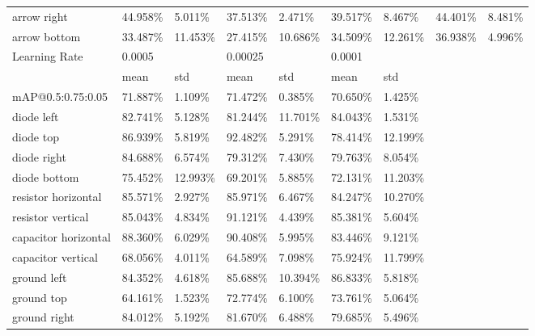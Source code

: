 \begin{table}[H]
\begin{center}
\begin{tabular}{|l|l|l|l|l|l|l|l|l|}
arrow right                     & 44.958\% & 5.011\%  & 37.513\% & 2.471\%  & 39.517\% & 8.467\%  & 44.401\% & 8.481\%   \\
\rowcolor{lightgray!50}
arrow bottom                    & 33.487\% & 11.453\% & 27.415\% & 10.686\% & 34.509\% & 12.261\% & 36.938\% & 4.996\%   \\
\hline
\hline
Learning Rate                   & 0.0005   &          & 0.00025  &          & 0.0001   &           & & \\
\hline
                                & mean     & std      & mean     & std      & mean     & std       & & \\
\hline
mAP@0.5:0.75:0.05               & 71.887\% & 1.109\%  & 71.472\% & 0.385\%  &  70.650\% & 1.425\%  & & \\
\hline
\rowcolor{lightgray!50}
diode left                      & 82.741\% & 5.128\%  & 81.244\% & 11.701\% &  84.043\% & 1.531\%  & & \\
diode top                       & 86.939\% & 5.819\%  & 92.482\% & 5.291\%  &  78.414\% & 12.199\% & & \\
\rowcolor{lightgray!50}
diode right                     & 84.688\% & 6.574\%  & 79.312\% & 7.430\%  &  79.763\% & 8.054\%  & & \\
diode bottom                    & 75.452\% & 12.993\% & 69.201\% & 5.885\%  &  72.131\% & 11.203\% & & \\
\rowcolor{lightgray!50}
resistor horizontal             & 85.571\% & 2.927\%  & 85.971\% & 6.467\%  &  84.247\% & 10.270\% & & \\
resistor vertical               & 85.043\% & 4.834\%  & 91.121\% & 4.439\%  &  85.381\% & 5.604\%  & & \\
\rowcolor{lightgray!50}
capacitor horizontal            & 88.360\% & 6.029\%  & 90.408\% & 5.995\%  &  83.446\% & 9.121\%  & & \\
capacitor vertical              & 68.056\% & 4.011\%  & 64.589\% & 7.098\%  &  75.924\% & 11.799\% & & \\
\rowcolor{lightgray!50}
ground left                     & 84.352\% & 4.618\%  & 85.688\% & 10.394\% &  86.833\% & 5.818\%  & & \\
ground top                      & 64.161\% & 1.523\%  & 72.774\% & 6.100\%  &  73.761\% & 5.064\%  & & \\
\rowcolor{lightgray!50}
ground right                    & 84.012\% & 5.192\%  & 81.670\% & 6.488\%  &  79.685\% & 5.496\%  & & \\

\end{tabular}
\end{center}
\end{table}
